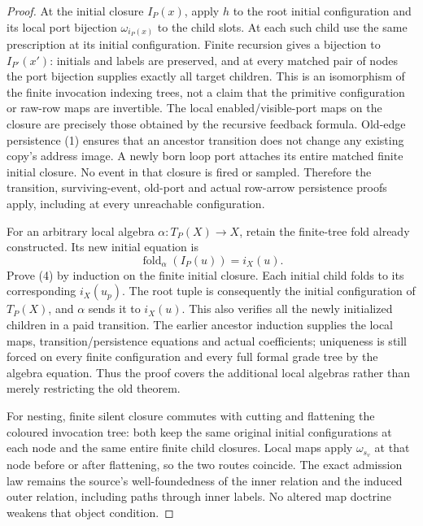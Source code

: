 \documentclass[11pt]{article}
\begin{document}
\begin{proof}
At the initial closure $I_P(x)$, apply $h$ to the root initial
configuration and its local port bijection $\omega_{i_P(x)}$ to the child
slots. At each such child use the same prescription at its initial
configuration. Finite recursion gives a bijection to $I_{P'}(x')$:
initials and labels are preserved, and at every matched pair of nodes
the port bijection supplies exactly all target children. This is an
isomorphism of the finite invocation indexing trees, not a claim that
the primitive configuration or raw-row maps are invertible.
The local enabled/visible-port maps on the closure are precisely those
obtained by the recursive feedback formula. Old-edge persistence (1)
ensures that an ancestor transition does not change any existing copy's
address image. A newly born loop port attaches its entire matched finite
initial closure. No event in that closure is fired or sampled. Therefore
the transition, surviving-event, old-port and actual row-arrow persistence
proofs apply, including at every unreachable configuration.

For an arbitrary local algebra $\alpha:T_P(X)\to X$, retain the finite-tree
fold already constructed. Its new initial equation is
\[
 \operatorname{fold}_\alpha(I_P(u))=i_X(u).                 \tag{4}
\]
Prove (4) by induction on the finite initial closure. Each initial child
folds to its corresponding $i_X(u_p)$. The root tuple is consequently
the initial configuration of $T_P(X)$, and $\alpha$ sends it to $i_X(u)$.
This also verifies all the newly initialized children in a paid
transition. The earlier ancestor induction supplies the local maps,
transition/persistence equations and actual coefficients; uniqueness is
still forced on every finite configuration and every full formal grade
tree by the algebra equation. Thus the proof covers the additional local
algebras rather than merely restricting the old theorem.

For nesting, finite silent closure commutes with cutting and flattening
the coloured invocation tree: both keep the same original initial
configurations at each node and the same entire finite child closures.
Local maps apply $\omega_{s_v}$ at that node before or after flattening,
so the two routes coincide. The exact admission law remains the source's
well-foundedness of the inner relation and the induced outer relation,
including paths through inner labels. No altered map doctrine weakens
that object condition.


\end{proof}
\end{document}
